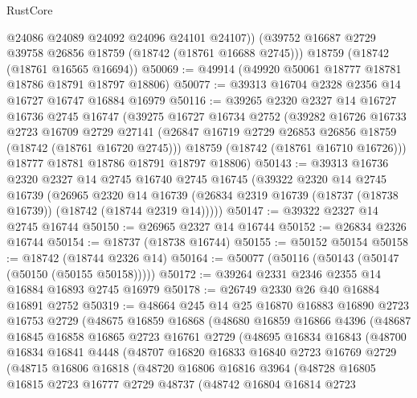 \begin{lexlean}{RustCore}
\begin{coremodule}
        @24086
        @24089
        @24092
        @24096
        @24101
        @24107))
    (@39752 @16687 @2729 @39758 @26856 @18759 (@18742 (@18761 @16688 @2745)))
    @18759
    (@18742 (@18761 @16565 @16694))
@50069 := @49914 (@49920 @50061 @18777 @18781 @18786 @18791 @18797 @18806)
@50077 := @39313 @16704 @2328 @2356 @14 @16727 @16747 @16884 @16979
@50116 := @39265
    @2320
    @2327
    @14
    @16727
    @16736
    @2745
    @16747
    (@39275
      @16727
      @16734
      @2752
      (@39282
        @16726
        @16733
        @2723
        @16709
        @2729
        @27141
        (@26847 @16719 @2729 @26853 @26856 @18759 (@18742 (@18761 @16720 @2745)))
        @18759
        (@18742 (@18761 @16710 @16726)))
      @18777
      @18781
      @18786
      @18791
      @18797
      @18806)
@50143 := @39313
    @16736
    @2320
    @2327
    @14
    @2745
    @16740
    @2745
    @16745
    (@39322
      @2320
      @14
      @2745
      @16739
      (@26965
        @2320
        @14
        @16739
        (@26834 @2319 @16739 (@18737 (@18738 @16739)) (@18742 (@18744 @2319 @14)))))
@50147 := @39322 @2327 @14 @2745 @16744
@50150 := @26965 @2327 @14 @16744
@50152 := @26834 @2326 @16744
@50154 := @18737 (@18738 @16744)
@50155 := @50152 @50154
@50158 := @18742 (@18744 @2326 @14)
@50164 := @50077 (@50116 (@50143 (@50147 (@50150 (@50155 @50158)))))
@50172 := @39264 @2331 @2346 @2355 @14 @16884 @16893 @2745 @16979
@50178 := @26749 @2330 @26 @40 @16884 @16891 @2752
@50319 := @48664
    @245
    @14
    @25
    @16870
    @16883
    @16890
    @2723
    @16753
    @2729
    (@48675
      @16859
      @16868
      (@48680
        @16859
        @16866
        @4396
        (@48687
          @16845
          @16858
          @16865
          @2723
          @16761
          @2729
          (@48695
            @16834
            @16843
            (@48700
              @16834
              @16841
              @4448
              (@48707
                @16820
                @16833
                @16840
                @2723
                @16769
                @2729
                (@48715
                  @16806
                  @16818
                  (@48720
                    @16806
                    @16816
                    @3964
                    (@48728
                      @16805
                      @16815
                      @2723
                      @16777
                      @2729
                      @48737
                      (@48742
                        @16804
                        @16814
                        @2723

\end{coremodule}
\end{lexlean}
